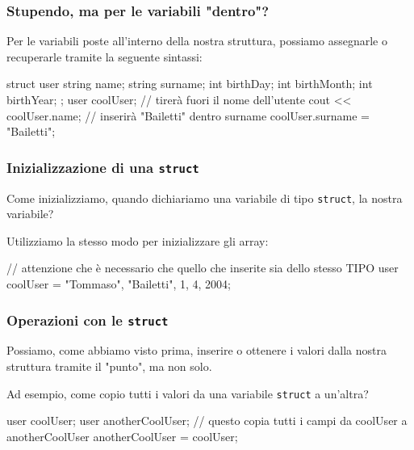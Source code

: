 \documentclass{beamer}
\begin{document}
    \begin{frame}[fragile]
        \frametitle{Stupendo, ma per le variabili "dentro"?}
    
        Per le variabili poste all'interno della nostra struttura, possiamo assegnarle o recuperarle tramite la seguente sintassi:
        
        \begin{cppcode}
            struct user {
                string name;
                string surname;
                int birthDay;
                int birthMonth;
                int birthYear;
            };
            user coolUser;
            // tirerà fuori il nome dell'utente
            cout << coolUser.name;
            // inserirà "Bailetti" dentro surname
            coolUser.surname = "Bailetti";
        \end{cppcode}
    
    \end{frame}

    \begin{frame}[fragile]
        \frametitle{Inizializzazione di una \texttt{struct}}
    
        Come inizializziamo, quando dichiariamo una variabile di tipo \texttt{struct}, la nostra variabile?

        Utilizziamo la stesso modo per inizializzare gli array:
        \begin{cppcode}
            // attenzione che è necessario che quello che inserite sia dello stesso TIPO
            user coolUser = {"Tommaso", "Bailetti", 1, 4, 2004};
        \end{cppcode}
    
    \end{frame}

    \begin{frame}[fragile]
        \frametitle{Operazioni con le \texttt{struct}}
    
        Possiamo, come abbiamo visto prima, inserire o ottenere i valori dalla nostra struttura tramite il "punto", ma non solo.
        
        Ad esempio, come copio tutti i valori da una variabile \texttt{struct} a un'altra?
        
        \begin{cppcode}
            user coolUser;
            user anotherCoolUser;
            // questo copia tutti i campi da coolUser a anotherCoolUser
            anotherCoolUser = coolUser;
        \end{cppcode}
    
    \end{frame}
\end{document}
